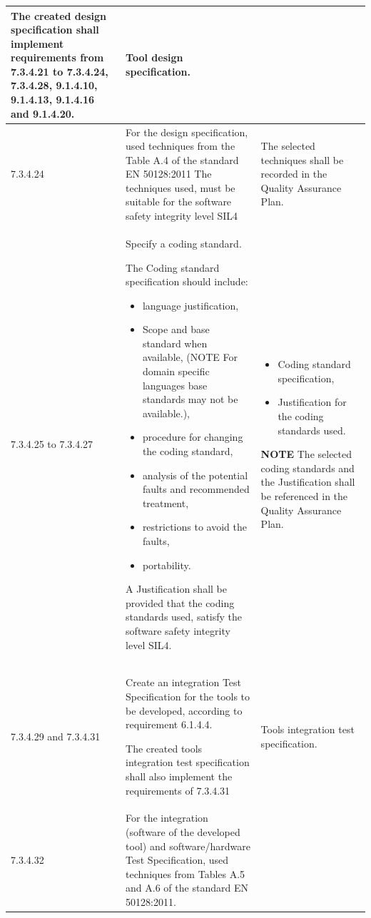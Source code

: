 \documentclass{template/openetcs_report}
\begin{document}
{\begin{longtable}{|p{2cm}|p{9cm}|p{3cm}|}
The created design specification shall implement requirements from 7.3.4.21 to 7.3.4.24, 7.3.4.28, 9.1.4.10, 9.1.4.13, 9.1.4.16 and 9.1.4.20.
& Tool design specification.\\ 
\hline
7.3.4.24 & For the design specification, used techniques from the Table A.4 of the standard EN 50128:2011
The techniques used, must be suitable for the software safety integrity level SIL4
& The selected techniques shall be recorded in the Quality Assurance Plan.\\ 
\hline
7.3.4.25 to 7.3.4.27 & 
Specify a coding standard.

The Coding standard specification should include:
\begin{itemize}\itemsep=0pt
  \item language justification,
  \item Scope and base standard when available, (NOTE For domain specific languages base standards may not be available.),
  \item procedure for changing the coding standard,
  \item analysis of the potential faults and recommended treatment,
  \item restrictions to avoid the faults,
  \item portability.
\end{itemize}


A Justification shall be provided that the coding standards used, satisfy the software safety integrity level SIL4.
& 
\begin{itemize}\itemsep=0pt
  \item Coding standard specification,
  \item Justification for the coding standards used.
\end{itemize}

\textbf{NOTE}\linebreak
The selected coding standards and the Justification shall be referenced in the Quality Assurance Plan.\\ 
\hline
7.3.4.29 and 7.3.4.31 & Create an integration Test Specification for the tools to be developed, according to requirement 6.1.4.4.

The created tools integration test specification shall also implement the requirements of 7.3.4.31
& Tools integration test specification.\\ 
\hline
7.3.4.32 & For the integration (software of the developed tool) and software/hardware Test Specification, used techniques from Tables A.5 and A.6 of the standard EN 50128:2011.


\end{longtable}}
\end{document}

